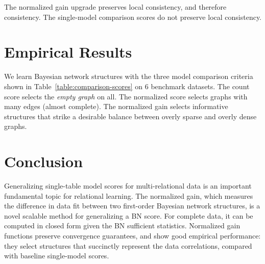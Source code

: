 \documentclass{article}
\begin{document}
\begin{theorem} \label{th:consistency}
The normalized gain upgrade preserves local consistency, and therefore consistency. The single-model comparison scores do not preserve local consistency.
\end{theorem}

\section{Empirical Results}

We learn Bayesian network structures with the three model comparison criteria shown in Table~\ref{table:comparison-scores} on 6 benchmark datasets. The count score selects the {\em empty graph} on all. The normalized score selects graphs with many edges (almost complete). The normalized gain selects informative structures that strike a desirable balance between overly sparse and overly dense graphs.

\section{Conclusion} Generalizing single-table model scores for multi-relational data is an important fundamental topic for relational learning. The normalized gain, which measures the difference in data fit between two first-order Bayesian network structures, is a novel scalable method for generalizing a BN score. For complete data, it can be computed in closed form given the BN sufficient statistics. Normalized gain functions preserve convergence guarantees, and show good empirical performance: they select structures that succinctly represent the data correlations, compared with baseline single-model scores.
%



\end{document}
